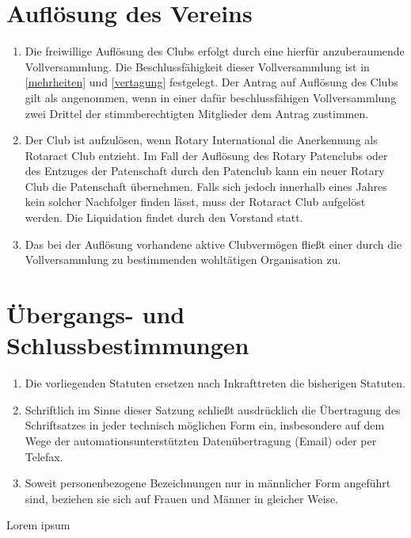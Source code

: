 \documentclass{statutclass}
\begin{document}
\section{Auflösung des Vereins}\label{aufloesung}
\begin{enumerate}
    \item Die freiwillige Auflösung des Clubs erfolgt durch eine hierfür anzuberaumende Vollversammlung. Die Beschlussfähigkeit dieser Vollversammlung ist in \ref{mehrheiten} und \ref{vertagung} festgelegt. Der Antrag auf Auflösung des Clubs gilt als angenommen, wenn in einer dafür beschlussfähigen Vollversammlung zwei Drittel der stimmberechtigten Mitglieder dem Antrag zustimmen.
    \item Der Club ist aufzulösen, wenn Rotary International die Anerkennung als Rotaract Club entzieht. Im Fall der Auflösung des Rotary Patenclubs oder des Entzuges der Patenschaft durch den Patenclub kann ein neuer Rotary Club die Patenschaft übernehmen. Falls sich jedoch innerhalb eines Jahres kein solcher Nachfolger finden lässt, muss der Rotaract Club aufgelöst werden. Die Liquidation findet durch den Vorstand statt.
    \item Das bei der Auflösung vorhandene aktive Clubvermögen fließt einer durch die Vollversammlung zu bestimmenden wohltätigen Organisation zu.
\end{enumerate}

\section{Übergangs- und Schlussbestimmungen}
\begin{enumerate}
    \item Die vorliegenden Statuten ersetzen nach Inkrafttreten die bisherigen Statuten.
    \item \glqq{}Schriftlich\grqq{} im Sinne dieser Satzung schließt ausdrücklich die Übertragung des Schriftsatzes in jeder technisch möglichen Form ein, insbesondere auf dem Wege der automationsunterstützten Datenübertragung (Email) oder per Telefax.
    \item Soweit personenbezogene Bezeichnungen nur in männlicher Form angeführt sind, beziehen sie sich auf Frauen und Männer in gleicher Weise.
\end{enumerate}

Lorem ipsum
\end{document}
